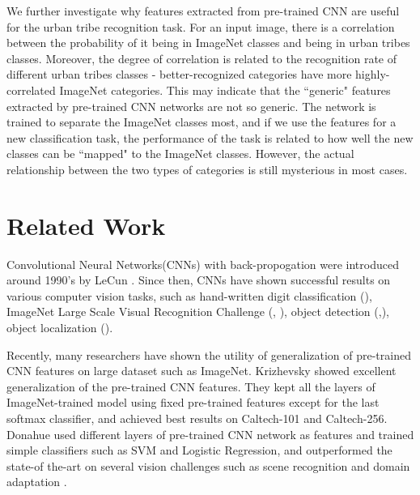 \documentclass[10pt,twocolumn,letterpaper]{article}
\begin{document}
We further investigate why features extracted from pre-trained CNN are useful for the urban tribe recognition task. For an input image, there is a correlation between the probability of it being in ImageNet classes and being in urban tribes classes. Moreover, the degree of correlation is related to the recognition rate of different urban tribes classes - better-recognized categories have more highly-correlated ImageNet categories. This may indicate that the ``generic" features extracted by pre-trained CNN networks are not so generic. The network is trained to separate the ImageNet classes most, and if we use the features for a new classification task, the performance of the task is related to how well the new classes can be ``mapped" to the ImageNet classes. However, the actual relationship between the two types of categories is still mysterious in most cases.


\section{Related Work}
Convolutional Neural Networks(CNNs) with back-propogation were introduced around 1990's by LeCun \etal\cite{lecun89}.  Since then, CNNs have shown successful results on various computer vision tasks, such as hand-written digit classification (\cite{lecun98}), ImageNet Large Scale Visual Recognition Challenge (\cite{ImageNet}, \cite{googlenet}), object detection (\cite{overfeat},\cite{googlenet}), object localization (\cite{overfeat}).

Recently, many researchers have shown the utility of generalization of pre-trained CNN features on large dataset such as ImageNet. Krizhevsky \etal showed excellent generalization of the pre-trained CNN features\cite{ImageNet13}. They kept all the layers of ImageNet-trained model using fixed pre-trained features except for the last softmax classifier, and achieved best results on Caltech-101 and Caltech-256. Donahue \etal used different layers of pre-trained CNN network as features and trained simple classifiers such as SVM and Logistic Regression, and outperformed the state-of the-art on several vision challenges such as scene recognition and domain adaptation\cite{decaf} . 
\end{document}
